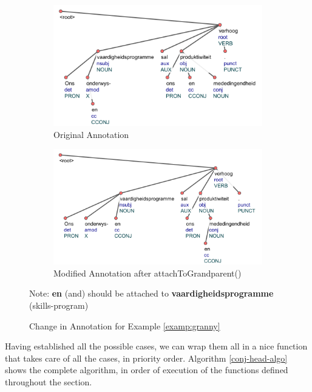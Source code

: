 \begin{figure}[H]
    \centering
    \begin{subfigure}{\textwidth}
    \includegraphics[scale=0.80]{img/grannyOriginal.png}
    \caption{Original Annotation}
    \label{fig:granny-1}
    \end{subfigure}
    \begin{subfigure}{\textwidth}
    \includegraphics[scale=0.80]{img/grannyModified.png}
    \caption{Modified Annotation after attachToGrandparent()}
    \label{fig:granny-2}
    \end{subfigure}
    \caption{Change in Annotation for Example \ref{examp:granny}}
    Note: \textbf{en} (and) should be attached to \textbf{vaardigheidsprogramme} (skills-program)
    \label{fig:granny}
\end{figure}

Having established all the possible cases, we can wrap them all in a nice function that takes care of all the cases, in priority order. Algorithm \ref{conj-head-algo} shows the complete algorithm, in order of execution of the functions defined throughout the section.

